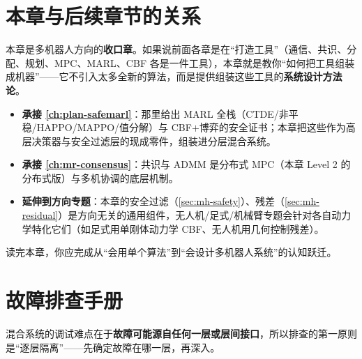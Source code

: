 \section*{本章与后续章节的关系}

本章是多机器人方向的\textbf{收口章}。如果说前面各章是在“打造工具”（通信、共识、分配、规划、MPC、MARL、CBF 各是一件工具），本章就是教你“如何把工具组装成机器”——它不引入太多全新的算法，而是提供组装这些工具的\textbf{系统设计方法论}。
\begin{itemize}
  \item \textbf{承接 \cref{ch:plan-safemarl}}：那里给出 MARL 全栈（CTDE/非平稳/HAPPO/MAPPO/值分解）与 CBF$+$博弈的安全证书；本章把这些作为高层决策器与安全过滤层的现成零件，组装进分层混合系统。
  \item \textbf{承接 \cref{ch:mr-consensus}}：共识与 ADMM 是分布式 MPC（本章 Level 2 的分布式版）与多机协调的底层机制。
  \item \textbf{延伸到方向专题}：本章的安全过滤（\cref{sec:mh-safety}）、残差（\cref{sec:mh-residual}）是方向无关的通用组件，无人机/足式/机械臂专题会针对各自动力学特化它们（如足式用单刚体动力学 CBF、无人机用几何控制残差）。
\end{itemize}
读完本章，你应完成从“会用单个算法”到“会设计多机器人系统”的认知跃迁。

\section*{故障排查手册}

混合系统的调试难点在于\textbf{故障可能源自任何一层或层间接口}，所以排查的第一原则是“逐层隔离”——先确定故障在哪一层，再深入。

